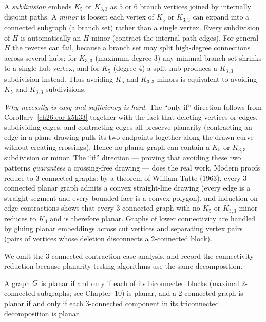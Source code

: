 \begin{intuitionbox}
A \emph{subdivision} embeds $K_5$ or $K_{3,3}$ as $5$ or $6$ branch vertices joined by
internally disjoint paths. A \emph{minor} is looser: each vertex of $K_5$ or $K_{3,3}$ can
expand into a connected subgraph (a branch set) rather than a single vertex. Every
subdivision of $H$ is automatically an $H$-minor (contract the internal path edges). For
general $H$ the reverse can fail, because a branch set may split high-degree connections
across several hubs; for $K_{3,3}$ (maximum degree $3$) any minimal branch set shrinks to
a single hub vertex, and for $K_5$ (degree $4$) a split hub produces a $K_{3,3}$
subdivision instead. Thus avoiding $K_5$ and $K_{3,3}$ minors is equivalent to avoiding
$K_5$ and $K_{3,3}$ subdivisions.
\end{intuitionbox}

\begin{whybox}
\emph{Why necessity is easy and sufficiency is hard.} The ``only if'' direction follows from
Corollary~\ref{ch26:cor-k5k33} together with the fact that deleting vertices or edges,
subdividing edges, and contracting edges all preserve planarity (contracting an edge in a
plane drawing pulls its two endpoints together along the drawn curve without creating
crossings). Hence no planar graph can contain a $K_5$ or $K_{3,3}$ subdivision or minor.
The ``if'' direction --- proving that avoiding these two patterns \emph{guarantees} a
crossing-free drawing --- does the real work. Modern proofs reduce to $3$-connected graphs:
by a theorem of William Tutte (1963), every $3$-connected planar graph admits a convex
straight-line drawing (every edge is a straight segment and every bounded face is a convex
polygon), and induction on edge contractions shows that every $3$-connected graph with no
$K_5$ or $K_{3,3}$ minor reduces to $K_4$ and is therefore planar. Graphs of lower
connectivity are handled by gluing planar embeddings across cut vertices and separating
vertex pairs (pairs of vertices whose deletion disconnects a $2$-connected block).
\end{whybox}

We omit the $3$-connected contraction case analysis, and record the connectivity reduction
because planarity-testing algorithms use the same decomposition.

\begin{lemma}
\label{ch26:lem-3conn}
A graph $G$ is planar if and only if each of its biconnected blocks (maximal
$2$-connected subgraphs; see Chapter~10) is planar, and a $2$-connected graph is planar if
and only if each $3$-connected component in its triconnected decomposition is planar.
\end{lemma}

